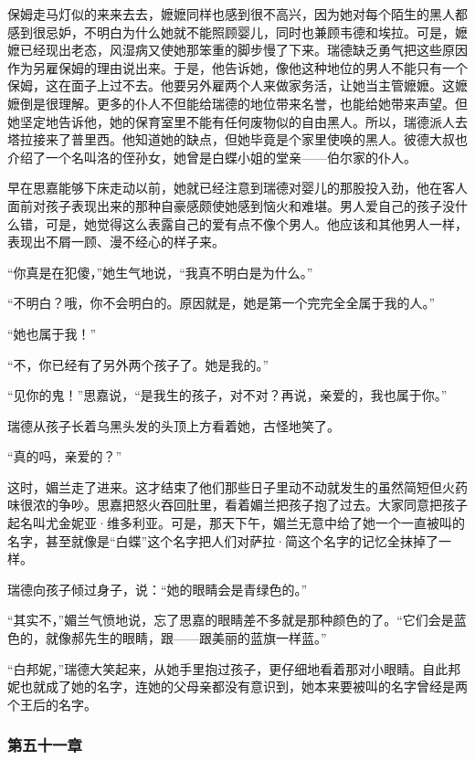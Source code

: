 \par 保姆走马灯似的来来去去，嬷嬷同样也感到很不高兴，因为她对每个陌生的黑人都感到很忌妒，不明白为什么她就不能照顾婴儿，同时也兼顾韦德和埃拉。可是，嬷嬷已经现出老态，风湿病又使她那笨重的脚步慢了下来。瑞德缺乏勇气把这些原因作为另雇保姆的理由说出来。于是，他告诉她，像他这种地位的男人不能只有一个保姆，这在面子上过不去。他要另外雇两个人来做家务活，让她当主管嬷嬷。这嬷嬷倒是很理解。更多的仆人不但能给瑞德的地位带来名誉，也能给她带来声望。但她坚定地告诉他，她的保育室里不能有任何废物似的自由黑人。所以，瑞德派人去塔拉接来了普里西。他知道她的缺点，但她毕竟是个家里使唤的黑人。彼德大叔也介绍了一个名叫洛的侄孙女，她曾是白蝶小姐的堂亲——伯尔家的仆人。
\par 早在思嘉能够下床走动以前，她就已经注意到瑞德对婴儿的那股投入劲，他在客人面前对孩子表现出来的那种自豪感颇使她感到恼火和难堪。男人爱自己的孩子没什么错，可是，她觉得这么表露自己的爱有点不像个男人。他应该和其他男人一样，表现出不屑一顾、漫不经心的样子来。
\par “你真是在犯傻，”她生气地说，“我真不明白是为什么。”
\par “不明白？哦，你不会明白的。原因就是，她是第一个完完全全属于我的人。”
\par “她也属于我！”
\par “不，你已经有了另外两个孩子了。她是我的。”
\par “见你的鬼！”思嘉说，“是我生的孩子，对不对？再说，亲爱的，我也属于你。”
\par 瑞德从孩子长着乌黑头发的头顶上方看着她，古怪地笑了。
\par “真的吗，亲爱的？”
\par 这时，媚兰走了进来。这才结束了他们那些日子里动不动就发生的虽然简短但火药味很浓的争吵。思嘉把怒火吞回肚里，看着媚兰把孩子抱了过去。大家同意把孩子起名叫尤金妮亚·维多利亚。可是，那天下午，媚兰无意中给了她一个一直被叫的名字，甚至就像是“白蝶”这个名字把人们对萨拉·简这个名字的记忆全抹掉了一样。
\par 瑞德向孩子倾过身子，说：“她的眼睛会是青绿色的。”
\par “其实不，”媚兰气愤地说，忘了思嘉的眼睛差不多就是那种颜色的了。“它们会是蓝色的，就像郝先生的眼睛，跟——跟美丽的蓝旗一样蓝。”
\par “白邦妮，”瑞德大笑起来，从她手里抱过孩子，更仔细地看着那对小眼睛。自此邦妮也就成了她的名字，连她的父母亲都没有意识到，她本来要被叫的名字曾经是两个王后的名字。

\subsubsection{第五十一章}

